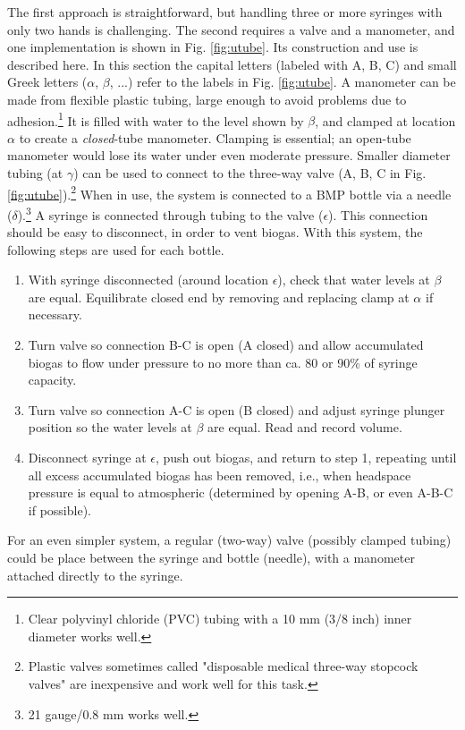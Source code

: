 \documentclass[]{article}
\begin{document}
The first approach is straightforward, but handling three or more syringes with only two hands is challenging.
The second requires a valve and a manometer, and one implementation is shown in Fig. \ref{fig:utube}.
Its construction and use is described here.
In this section the capital letters (labeled with A, B, C) and small Greek letters ($\alpha$, $\beta$, ...) refer to the labels in Fig. \ref{fig:utube}.
A manometer can be made from flexible plastic tubing, large enough to avoid problems due to adhesion.\footnote{Clear polyvinyl chloride (PVC) tubing with a 10 mm (3/8 inch) inner diameter works well.}
It is filled with water to the level shown by $\beta$, and clamped at location $\alpha$ to create a \textit{closed}-tube manometer.
Clamping is essential; an open-tube manometer would lose its water under even moderate pressure.
Smaller diameter tubing (at $\gamma$) can be used to connect to the three-way valve (A, B, C in Fig. \ref{fig:utube}).\footnote{Plastic valves sometimes called "disposable medical three-way stopcock valves" are inexpensive and work well for this task.}
When in use, the system is connected to a BMP bottle via a needle ($\delta$).\footnote{21 gauge/0.8 mm works well.}
A syringe is connected through tubing to the valve ($\epsilon$).
This connection should be easy to disconnect, in order to vent biogas.
With this system, the following steps are used for each bottle.

\begin{enumerate}
  \item With syringe disconnected (around location $\epsilon$), check that water levels at $\beta$ are equal. Equilibrate closed end by removing and replacing clamp at $\alpha$ if necessary.
  \item Turn valve so connection B-C is open (A closed) and allow accumulated biogas to flow under pressure to no more than ca. 80 or 90\% of syringe capacity.
  \item Turn valve so connection A-C is open (B closed) and adjust syringe plunger position so the water levels at $\beta$ are equal. Read and record volume.
  \item Disconnect syringe at $\epsilon$, push out biogas, and return to step 1, repeating until all excess accumulated biogas has been removed, i.e., when headspace pressure is equal to atmospheric (determined by opening A-B, or even A-B-C if possible).
\end{enumerate}

For an even simpler system, a regular (two-way) valve (possibly clamped tubing) could be place between the syringe and bottle (needle), with a manometer attached directly to the syringe.
\end{document}
